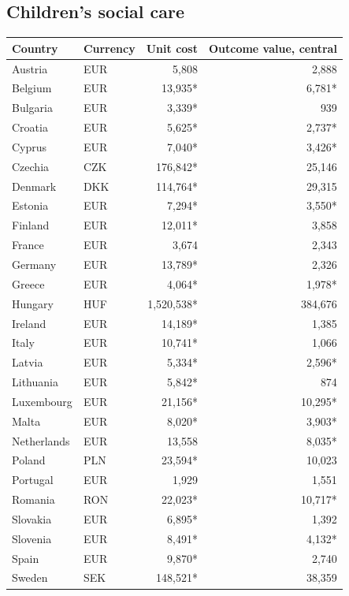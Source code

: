 \subsection*{Children's social care}
\begin{longtable}{llrr}
\toprule
Country & Currency & Unit cost & Outcome value, central \\
\midrule
\endhead
Austria & EUR & 5,808 & 2,888 \\
Belgium & EUR & 13,935* & 6,781* \\
Bulgaria & EUR & 3,339* & 939 \\
Croatia & EUR & 5,625* & 2,737* \\
Cyprus & EUR & 7,040* & 3,426* \\
Czechia & CZK & 176,842* & 25,146 \\
Denmark & DKK & 114,764* & 29,315 \\
Estonia & EUR & 7,294* & 3,550* \\
Finland & EUR & 12,011* & 3,858 \\
France & EUR & 3,674 & 2,343 \\
Germany & EUR & 13,789* & 2,326 \\
Greece & EUR & 4,064* & 1,978* \\
Hungary & HUF & 1,520,538* & 384,676 \\
Ireland & EUR & 14,189* & 1,385 \\
Italy & EUR & 10,741* & 1,066 \\
Latvia & EUR & 5,334* & 2,596* \\
Lithuania & EUR & 5,842* & 874 \\
Luxembourg & EUR & 21,156* & 10,295* \\
Malta & EUR & 8,020* & 3,903* \\
Netherlands & EUR & 13,558 & 8,035* \\
Poland & PLN & 23,594* & 10,023 \\
Portugal & EUR & 1,929 & 1,551 \\
Romania & RON & 22,023* & 10,717* \\
Slovakia & EUR & 6,895* & 1,392 \\
Slovenia & EUR & 8,491* & 4,132* \\
Spain & EUR & 9,870* & 2,740 \\
Sweden & SEK & 148,521* & 38,359 \\
\bottomrule
\end{longtable}

